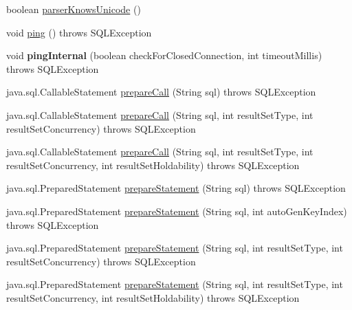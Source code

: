 \begin{DoxyCompactItemize}
\item 
boolean \mbox{\hyperlink{classcom_1_1mysql_1_1jdbc_1_1_connection_impl_a7aebd878f6c8a52c2d2ea690734e681f}{parser\+Knows\+Unicode}} ()
\item 
void \mbox{\hyperlink{classcom_1_1mysql_1_1jdbc_1_1_connection_impl_a8a8888884eb200c850f66c3708afad14}{ping}} ()  throws S\+Q\+L\+Exception 
\item 
\mbox{\label{classcom_1_1mysql_1_1jdbc_1_1_connection_impl_a11b0d2d181936259b009d61fa584c6bf}} 
void {\bfseries ping\+Internal} (boolean check\+For\+Closed\+Connection, int timeout\+Millis)  throws S\+Q\+L\+Exception 
\item 
java.\+sql.\+Callable\+Statement \mbox{\hyperlink{classcom_1_1mysql_1_1jdbc_1_1_connection_impl_a1c125cde555184e9117a49cf140184e4}{prepare\+Call}} (String sql)  throws S\+Q\+L\+Exception 
\item 
java.\+sql.\+Callable\+Statement \mbox{\hyperlink{classcom_1_1mysql_1_1jdbc_1_1_connection_impl_ab44319ffdc136817efca3040507a1cdf}{prepare\+Call}} (String sql, int result\+Set\+Type, int result\+Set\+Concurrency)  throws S\+Q\+L\+Exception 
\item 
java.\+sql.\+Callable\+Statement \mbox{\hyperlink{classcom_1_1mysql_1_1jdbc_1_1_connection_impl_ac6d1a47de58f0636b2b921aa47f8bfa1}{prepare\+Call}} (String sql, int result\+Set\+Type, int result\+Set\+Concurrency, int result\+Set\+Holdability)  throws S\+Q\+L\+Exception 
\item 
java.\+sql.\+Prepared\+Statement \mbox{\hyperlink{classcom_1_1mysql_1_1jdbc_1_1_connection_impl_ae88b1d09280bb34e6e52efff869ce61f}{prepare\+Statement}} (String sql)  throws S\+Q\+L\+Exception 
\item 
java.\+sql.\+Prepared\+Statement \mbox{\hyperlink{classcom_1_1mysql_1_1jdbc_1_1_connection_impl_a43922e839ec8ab1bac49422ad317b1d8}{prepare\+Statement}} (String sql, int auto\+Gen\+Key\+Index)  throws S\+Q\+L\+Exception 
\item 
java.\+sql.\+Prepared\+Statement \mbox{\hyperlink{classcom_1_1mysql_1_1jdbc_1_1_connection_impl_a18afe2c6cb7638fb24284863be9a4350}{prepare\+Statement}} (String sql, int result\+Set\+Type, int result\+Set\+Concurrency)  throws S\+Q\+L\+Exception 
\item 
java.\+sql.\+Prepared\+Statement \mbox{\hyperlink{classcom_1_1mysql_1_1jdbc_1_1_connection_impl_af7e71a40722d396ca129cf1b4483e0a9}{prepare\+Statement}} (String sql, int result\+Set\+Type, int result\+Set\+Concurrency, int result\+Set\+Holdability)  throws S\+Q\+L\+Exception 

\end{DoxyCompactItemize}
